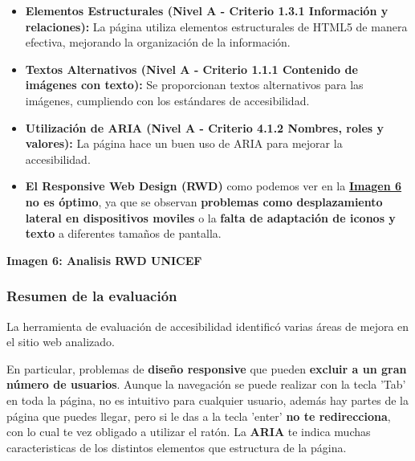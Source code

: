 \documentclass[a4paper]{article}
\newcommand{\responsiveUnicef}{responsiveUnicef.png}
\begin{document}
    \begin{itemize}
    	\item \textbf{Elementos Estructurales (Nivel A - Criterio 1.3.1 Información y relaciones):} La página utiliza elementos estructurales de HTML5 de manera efectiva, mejorando la organización de la información.
    			
    	\item \textbf{Textos Alternativos (Nivel A - Criterio 1.1.1 Contenido de imágenes con texto):} Se proporcionan textos alternativos para las imágenes, cumpliendo con los estándares de accesibilidad.
    						
    	\item \textbf{Utilización de ARIA (Nivel A - Criterio 4.1.2 Nombres, roles y valores):} La página hace un buen uso de ARIA para mejorar la accesibilidad.
    
    	\item \textbf{El Responsive Web Design (RWD)} como podemos ver en la \textbf{\hyperref[fig:imagen-rwd-unicef]{Imagen 6}} \textbf{no es óptimo}, ya que se observan \textbf{problemas como desplazamiento lateral en dispositivos moviles} o la \textbf{falta de adaptación de iconos y texto} a diferentes tamaños de pantalla.
    \end{itemize}
    
   \begin{center}
        \vspace{0.2cm}\par
        \textbf{Imagen 6: Analisis RWD UNICEF\label{fig:imagen-rwd-unicef}}
    \end{center}

    \subsubsection{Resumen de la evaluación\texorpdfstring{\vspace{0.2cm}}{}} 

    
    La herramienta de evaluación de accesibilidad identificó varias áreas de mejora en el sitio web analizado.\vspace{0.2cm}
        
    En particular, problemas de \textbf{diseño responsive} que pueden \textbf{excluir a un gran número de usuarios}. Aunque la navegación se puede realizar con la tecla 'Tab' en toda la página, no es intuitivo para cualquier usuario, además hay partes de la página que puedes llegar, pero si le das a la tecla 'enter' \textbf{no te redirecciona}, con lo cual te vez obligado a utilizar el ratón. La \textbf{ARIA} te indica muchas caracteristicas de los distintos elementos que estructura de la página. \vspace{0.2cm}
    
\end{document}
